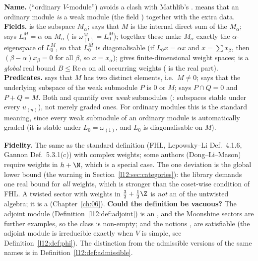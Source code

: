 \begin{dictionary}
\textbf{Name.}  (``ordinary $V$-module'') avoids a clash with Mathlib's . 
means that an ordinary module \emph{is} a weak module (the field ) together with the extra data.
\textbf{Fields.}  is the subspace $M_\alpha$;  says that $M$ is the internal direct sum of the
$M_\alpha$;  says $L_0^M=\alpha$ on $M_\alpha$ ( is $\omega^M_{(1)} = L^M_0$); together these make
$M_\alpha$ exactly the $\alpha$-eigenspace of $L^M_0$, so that $L_0^M$ is diagonalisable (if $L_0x=\alpha x$ and
$x=\sum x_\beta$, then $(\beta-\alpha)x_\beta=0$ for all $\beta$, so $x=x_\alpha$);  gives finite-dimensional weight
spaces;  is a \emph{global} real bound $B\le\mathrm{Re}\,\alpha$ on all occurring weights ( is the real
part). \textbf{Predicates.}  says that $M$ has two distinct elements, i.e.\ $M\neq0$;  says that the underlying subspace of the weak submodule $P$ is $0$ or $M$;  says
$P\cap Q = 0$ and $P+Q = M$. Both  and  quantify over \emph{weak} submodules
(: subspaces stable under every $u_{(n)}$), not merely graded ones. For ordinary modules this is the
standard meaning, since every weak submodule of an ordinary module is automatically graded (it is stable under $L_0=\omega_{(1)}$, and
$L_0$ is diagonalisable on $M$).

\textbf{Fidelity.} The same as the standard definition (FHL, Lepowsky--Li Def.~4.1.6, Gannon Def.~5.3.1(c)) with complex weights; some authors (Dong--Li--Mason) require weights in $h+\N$,
which is a special case. The one deviation is the global lower bound (the warning in Section~\ref{l12:sec:categories}): the library demands one real
bound for \emph{all} weights, which is stronger than the coset-wise condition of FHL. A twisted sector with weights in
$\tfrac32+\tfrac12\Z$ is \emph{not} an  of the untwisted algebra; it is a  (Chapter~\ref{ch:06}).
\textbf{Could the definition be vacuous?} The adjoint module (Definition~\ref{l12:def:adjoint}) is an , and the
Moonshine sectors are further examples, so the class is non-empty; and the notions ,
 are satisfiable (the adjoint module is irreducible exactly when $V$ is simple, see Definition~\ref{l12:def:phi}). The distinction from the admissible versions of the same names is in Definition~\ref{l12:def:admissible}.
\end{dictionary}

